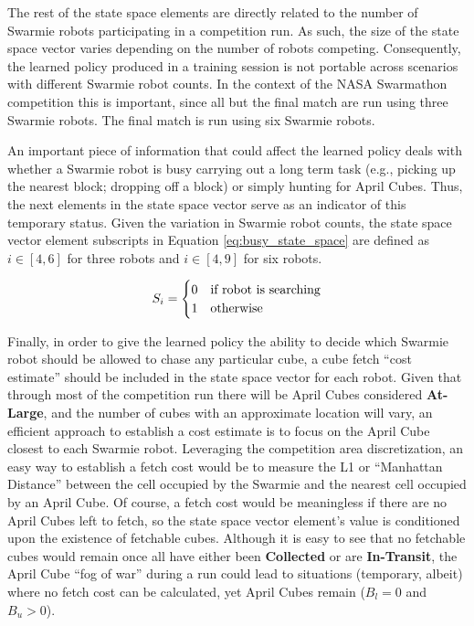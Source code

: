 \documentclass[sigconf,authordraft]{acmart}
\begin{document}
The rest of the state space elements are directly related to the number of Swarmie robots participating in a competition run. As such, the size of the state space vector varies depending on the number of robots competing. Consequently, the learned policy produced in a training session is not portable across scenarios with different Swarmie robot counts. In the context of the NASA Swarmathon competition this is important, since all but the final match are run using three Swarmie robots. The final match is run using six Swarmie robots.

An important piece of information that could affect the learned policy deals with whether a Swarmie robot is busy carrying out a long term task (e.g., picking up the nearest block; dropping off a block) or simply hunting for April Cubes. Thus, the next elements in the state space vector serve as an indicator of this temporary status. Given the variation in Swarmie robot counts, the state space vector element subscripts in Equation \ref{eq:busy_state_space} are defined as $i \in [4,6]$ for three robots and $i \in [4,9]$ for six robots.

\begin{equation}\label{eq:busy_state_space}
  S_i =
    \begin{cases}
      0 & \textup{if robot is searching} \\
      1 & \textup{otherwise}
    \end{cases}
\end{equation}

Finally, in order to give the learned policy the ability to decide which Swarmie robot should be allowed to chase any particular cube, a cube fetch ``cost estimate'' should be included in the state space vector for each robot. Given that through most of the competition run there will be April Cubes considered \textbf{At-Large}, and the number of cubes with an approximate location will vary, an efficient approach to establish a cost estimate is to focus on the April Cube closest to each Swarmie robot. Leveraging the competition area discretization, an easy way to establish a fetch cost would be to measure the L1 or ``Manhattan Distance'' between the cell occupied by the Swarmie and the nearest cell occupied by an April Cube. Of course, a fetch cost would be meaningless if there are no April Cubes left to fetch, so the state space vector element's value is conditioned upon the existence of fetchable cubes. Although it is easy to see that no fetchable cubes would remain once all have either been \textbf{Collected} or are \textbf{In-Transit}, the April Cube ``fog of war'' during a run could lead to situations (temporary, albeit) where no fetch cost can be calculated, yet April Cubes remain ($B_l = 0$ and $B_u > 0$).
\end{document}
